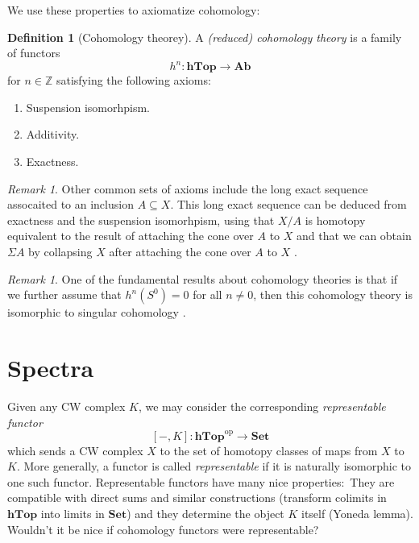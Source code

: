 \documentclass[12pt,a4paper]{amsart}
\theoremstyle{plain}
\theoremstyle{definition}
\newtheorem{defn}[thm]{Definition}
\theoremstyle{remark}
\newtheorem{rem}[thm]{Remark}
\begin{document}
We use these properties to axiomatize cohomology:

\begin{defn}[Cohomology theorey]
  A \emph{(reduced) cohomology theory} is a family of functors
  \[ h^{n} \colon \mathbf{hTop} \to \mathbf{Ab} \]
  for $n \in \mathbb{Z}$ satisfying the following axioms:
  \begin{enumerate}[label=(\roman*)]
    \item Suspension isomorhpism.
    \item Additivity.
    \item Exactness.
  \end{enumerate}
\end{defn}

\begin{rem}
  Other common sets of axioms include the long exact sequence assocaited to an inclusion $A \subseteq X$.
  This long exact sequence can be deduced from exactness and the suspension isomorhpism, using that $X/A$ is homotopy equivalent to the result of attaching the cone over $A$ to $X$ \cite[Theorem VII.1.6]{bre93} and that we can obtain $\Sigma A$ by collapsing $X$ after attaching the cone over $A$ to $X$ \cite[Corollary VII.5.5]{bre93}.
\end{rem}

\begin{rem}
  One of the fundamental results about cohomology theories is that if we further assume that $h^{n}(S^{0}) = 0$ for all $n \neq 0$, then this cohomology theory is isomorphic to singular cohomology \cite[Theorem 4.59]{hat02}.
\end{rem}

\section{Spectra}

Given any CW complex $K$, we may consider the corresponding \emph{representable functor}
\[ [-,K] \colon \mathbf{hTop}^{\mathrm{op}} \to \mathbf{Set} \]
which sends a CW complex $X$ to the set of homotopy classes of maps from $X$ to $K$.
More generally, a functor is called \emph{representable} if it is naturally isomorphic to one such functor.
Representable functors have many nice properties:~They are compatible with direct sums and similar constructions (transform colimits in $\mathbf{hTop}$ into limits in $\mathbf{Set}$) and they determine the object $K$ itself (Yoneda lemma).
Wouldn't it be nice if cohomology functors were representable?
\end{document}
